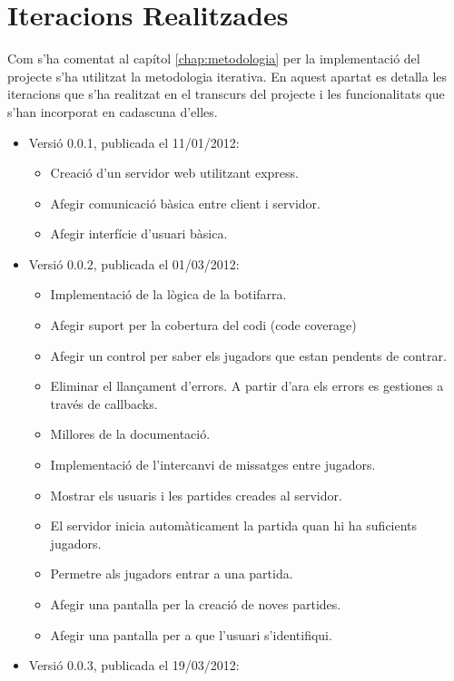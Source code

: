 \section{Iteracions Realitzades}

Com s'ha comentat al capítol \ref{chap:metodologia} per la implementació del projecte s'ha utilitzat la metodologia iterativa. En aquest apartat es detalla les iteracions que s'ha realitzat en el transcurs del projecte i les funcionalitats que s'han incorporat en cadascuna d'elles. 

\begin{itemize}
\item{Versió 0.0.1, publicada el 11/01/2012:
    \begin{itemize}
        \item{Creació d'un servidor web utilitzant express.}
        \item{Afegir comunicació bàsica entre client i servidor.}
        \item{Afegir interfície d'usuari bàsica.}
    \end{itemize}
}
\item{Versió 0.0.2, publicada el 01/03/2012: 
    \begin{itemize}
        \item{Implementació de la lògica de la botifarra.}
        \item{Afegir suport per la cobertura del codi (code coverage)}
        \item{Afegir un control per saber els jugadors que estan pendents de contrar.}
        \item{Eliminar el llançament d'errors. A partir d'ara els errors es gestiones a través de callbacks.}
        \item{Millores de la documentació.}
        \item{Implementació de l'intercanvi de missatges entre jugadors.}
        \item{Mostrar els usuaris i les partides creades al servidor.}
        \item{El servidor inicia automàticament la partida quan hi ha suficients jugadors.}
        \item{Permetre als jugadors entrar a una partida.}
        \item{Afegir una pantalla per la creació de noves partides.} 
        \item{Afegir una pantalla per a que l'usuari s'identifiqui.}
    \end{itemize}
}
\item{Versió 0.0.3, publicada el 19/03/2012: 
}
\end{itemize}
